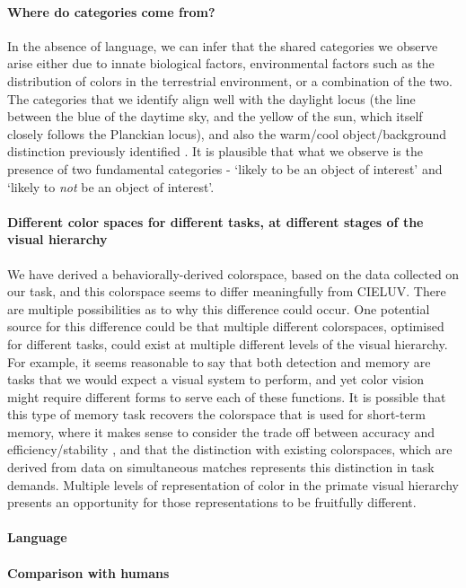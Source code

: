
\paragraph{Where do categories come from?}
In the absence of language, we can infer that the shared categories we observe arise either due to innate biological factors, environmental factors such as the distribution of colors in the terrestrial environment, or a combination of the two.
The categories that we identify align well with the daylight locus (the line between the blue of the daytime sky, and the yellow of the sun, which itself closely follows the Planckian locus), and also the warm/cool object/background distinction previously identified \citep{rosenthal_color_2018}. It is plausible that what we observe is the presence of two fundamental categories - `likely to be an object of interest' and `likely to \emph{not} be an object of interest'. 


\paragraph{Different color spaces for different tasks, at different stages of the visual hierarchy}

We have derived a behaviorally-derived colorspace, based on the data collected on our task, and this colorspace seems to differ meaningfully from CIELUV. %
There are multiple possibilities as to why this difference could occur.
One potential source for this difference could be that multiple different colorspaces, optimised for different tasks, could exist at multiple different levels of the visual hierarchy.
For example, it seems reasonable to say that both detection and memory are tasks that we would expect a visual system to perform, and yet color vision might require different forms to serve each of these functions.
It is possible that this type of memory task recovers the colorspace that is used for short-term memory, where it makes sense to consider the trade off between accuracy and efficiency/stability \citep{panichello_error-correcting_2019}, and that the distinction with existing colorspaces, which are derived from data on simultaneous matches represents this distinction in task demands.
Multiple levels of representation of color in the primate visual hierarchy presents an opportunity for those representations to be fruitfully different.

\paragraph{Language}

\paragraph{Comparison with humans} %

